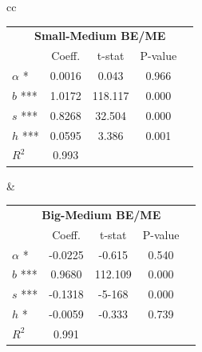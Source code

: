 \begin{center}
\begin{tabular}{cc}
\begin{tabular}{lcccc}
 \toprule
 
 \multicolumn{5}{c}{\textbf{Small-Medium BE/ME} }\\
 & Coeff. & t-stat & P-value &\\
 $\alpha$ * & 	0.0016	& 0.043 & 0.966 &\\
 $b$ ***& 1.0172 & 118.117& 0.000 &\\
 $s$ ***  & 0.8268& 32.504 & 0.000 &\\
 $h$ *** &  0.0595& 3.386 & 0.001 & \\
 
 $R^2$ & 0.993 & & & \\
 \hline			
\end{tabular} & \begin{tabular}{lcccc}
\toprule

\multicolumn{5}{c}{\textbf{Big-Medium BE/ME} }\\
& Coeff. & t-stat & P-value &\\
$\alpha$ *& 	-0.0225	&-0.615 & 0.540 &\\
$b$ ***& 0.9680 & 112.109& 0.000 &\\
$s$ ***& -0.1318& -5-168 & 0.000 &\\
$h$ *&  -0.0059& -0.333 & 0.739 & \\

$R^2$ & 0.991 & & & \\
\hline			
\end{tabular}
\end{tabular}		
\end{center}

